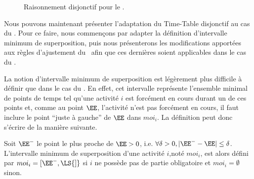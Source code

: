 \begin{ex}
\begin{figure}[htb!]
{
}
  \caption{Raisonnement disjonctif pour le \CECSP.}
  \label{fig:disj_CECSP}
\end{figure}
\end{ex}

Nous pouvons maintenant présenter l'adaptation du Time-Table
disjonctif au cas du \CECSP. Pour ce faire, nous commençons par
adapter la définition d'intervalle minimum de superposition, puis nous
présenterons les modifications apportées aux règles d'ajustement du
\CUSP~afin que ces dernières soient applicables dans le cas du
\CECSP.

La notion d'intervalle minimum de superposition est légèrement plus
difficile à définir que dans le cas du \CUSP. En effet, cet intervalle
représente l'ensemble minimal de points de temps tel qu'une activité
$i$ est forcément en cours durant un de ces points et, comme au point
$\EE$, l'activité n'est pas forcément en cours, il faut inclure le
point ``juste à gauche'' de $\EE$ dans $moi_i$.  La définition peut
donc s'écrire de la manière suivante. 

\begin{defi}
\label{des:moi_CUSP} 
Soit $\EE^{-}$ le point le plus proche de $\EE > 0$, i.e. $\forall \delta
>0 , |\EE^{-} -\EE| \le \delta$. L'intervalle minimum de
superposition d'une activité $i$,noté $moi_i$, est alors défini par
$moi_i=[\EE^{-},\LS{]}$ si $i$ ne possède pas de partie obligatoire et
$moi_i=\emptyset$ sinon.   
\end{defi}

